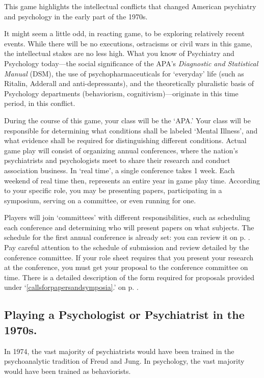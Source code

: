 This game highlights the intellectual conflicts that changed American psychiatry and psychology in the early part of the 1970s.

It might seem a little odd, in reacting game, to be exploring relatively recent events. While there will be no executions, ostracisms or civil wars in this game, the intellectual stakes are no less high. What you know of Psychiatry and Psychology today---the social significance of the APA's \emph{Diagnostic and Statistical Manual }(DSM), the use of psychopharmaceuticals for `everyday' life (such as Ritalin, Adderall and anti-depressants), and the theoretically pluralistic basis of Psychology departments (behaviorism, cognitivism)---originate in this time period, in this conflict. 

During the course of this game, your class will be the `APA.' Your class will be responsible for determining what conditions shall be labeled `Mental Illness', and what evidence shall be required for distinguishing different conditions. Actual game play will consist of organizing annual conferences, where the nation's psychiatrists and psychologists meet to share their research and conduct association business. In `real time', a single conference takes 1 week. Each weekend of real time then, represents an entire year in game play time. According to your specific role, you may be presenting papers, participating in a symposium, serving on a committee, or even running for one.

Players will join `committees' with different responsibilities, such as scheduling each conference and determining who will present papers on what subjects. The schedule for the first annual conference is already set: you can review it on p. \pageref{conferenceschedulefor1971} . Pay careful attention to the schedule of submission and review detailed by the conference committee. If your role sheet requires that you present your research at the conference, you must get your proposal to the conference committee on time. There is a detailed description of the form required for proposals provided under `\ref{callsforpapersandsymposia}.' on p. \pageref{callsforpapersandsymposia}.

\subsection{Playing a Psychologist or Psychiatrist in the 1970s.}
\label{playingapsychologistorpsychiatristinthe1970s.}

In 1974, the vast majority of psychiatrists would have been trained in the psychoanalytic tradition of Freud and Jung. In psychology, the vast majority would have been trained as behaviorists.

